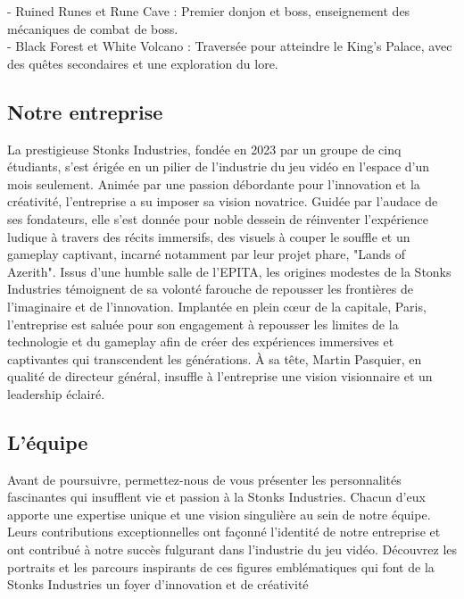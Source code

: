 - Ruined Runes et Rune Cave : Premier donjon et boss, enseignement des mécaniques de combat de boss.
\\

- Black Forest et White Volcano : Traversée pour atteindre le King's Palace, avec des quêtes secondaires et une exploration du lore.
\\



\subsection{Notre entreprise}

La prestigieuse Stonks Industries, fondée en 2023 par un groupe de cinq étudiants, s'est érigée en un pilier de l'industrie du jeu vidéo en l'espace d'un mois seulement. Animée par une passion débordante pour l'innovation et la créativité, l'entreprise a su imposer sa vision novatrice. Guidée par l'audace de ses fondateurs, elle s'est donnée pour noble dessein de réinventer l'expérience ludique à travers des récits immersifs, des visuels à couper le souffle et un gameplay captivant, incarné notamment par leur projet phare, "Lands of Azerith". Issus d'une humble salle de l'EPITA, les origines modestes de la Stonks Industries témoignent de sa volonté farouche de repousser les frontières de l'imaginaire et de l'innovation.
Implantée en plein cœur de la capitale, Paris, l'entreprise est saluée pour son engagement à repousser les limites de la technologie et du gameplay afin de créer des expériences immersives et captivantes qui transcendent les générations. À sa tête, Martin Pasquier, en qualité de directeur général, insuffle à l'entreprise une vision visionnaire et un leadership éclairé.

\subsection{L'équipe}

Avant de poursuivre, permettez-nous de vous présenter les personnalités fascinantes qui insufflent vie et passion à la Stonks Industries. 
Chacun d'eux apporte une expertise unique et une vision singulière au sein de notre équipe.
 Leurs contributions exceptionnelles ont façonné l'identité de notre entreprise et ont contribué à notre succès fulgurant dans l'industrie du jeu vidéo. 
 Découvrez les portraits et les parcours inspirants de ces figures emblématiques qui font de la Stonks Industries un foyer d'innovation et de créativité

